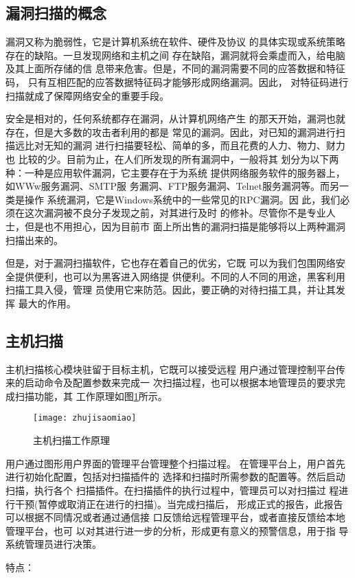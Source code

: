 \documentclass{article}
\begin{document}
\subsection{漏洞扫描的概念}
漏洞又称为脆弱性，它是计算机系统在软件、硬件及协议
的具体实现或系统策略存在的缺陷。一旦发现网络和主机之间
存在缺陷，漏洞就将会乘虚而入，给电脑及其上面所存储的信
息带来危害。但是，不同的漏洞需要不同的应答数据和特征码，
只有互相匹配的应答数据特征码才能够形成网络漏洞。因此，
对特征码进行扫描就成了保障网络安全的重要手段。

安全是相对的，任何系统都存在漏洞，从计算机网络产生
的那天开始，漏洞也就存在，但是大多数的攻击者利用的都是
常见的漏洞。因此，对已知的漏洞进行扫描远比对无知的漏洞
进行扫描要轻松、简单的多，而且花费的人力、物力、财力也
比较的少。目前为止，在人们所发现的所有漏洞中，一般将其
划分为以下两种：一种是应用软件漏洞，它主要存在于为系统
提供网络服务软件的服务器上，如WWw服务漏洞、SMTP服
务漏洞、FTP服务漏洞、Telnet服务漏洞等。而另一类是操作
系统漏洞，它是Windows系统中的一些常见的RPC漏洞。因
此，我们必须在这次漏洞被不良分子发现之前，对其进行及时
的修补。尽管你不是专业人士，但是也不用担心，因为目前市
面上所出售的漏洞扫描是能够将以上两种漏洞扫描出来的。

但是，对于漏洞扫描软件，它也存在着自己的优劣，它既
可以为我们包围网络安全提供便利，也可以为黑客进入网络提
供便利。不同的人不同的用途，黑客利用扫描工具入侵，管理
员使用它来防范。因此，要正确的对待扫描工具，并让其发挥
最大的作用。\citep{loudongsaomiao}
\subsection{主机扫描}
主机扫描核心模块驻留于目标主机，它既可以接受远程
用户通过管理控制平台传来的启动命令及配置参数来完成一
次扫描过程，也可以根据本地管理员的要求完成扫描功能，其
工作原理如图\ref{fig:23}所示。
    \begin{figure}[H]
	\centering
	\texttt{[image: zhujisaomiao]}
	\caption{主机扫描工作原理}
	\label{fig:23}
    \end{figure}
用户通过图形用户界面的管理平台管理整个扫描过程。
在管理平台上，用户首先进行初始化配置，包括对扫描插件的
选择和扫描时所需参数的配置等。然后启动扫描，执行各个
扫描插件。在扫描插件的执行过程中，管理员可以对扫描过
程进行干预(暂停或取消正在进行的扫描)。当完成扫描后，
形成正式的报告，此报告可以根据不同情况或者通过通信接
口反馈给远程管理平台，或者直接反馈给本地管理平台，也可
以对其进行进一步的分析，形成更有意义的预警信息，用于指
导系统管理员进行决策。\citep{Unix}

特点：
\end{document}
